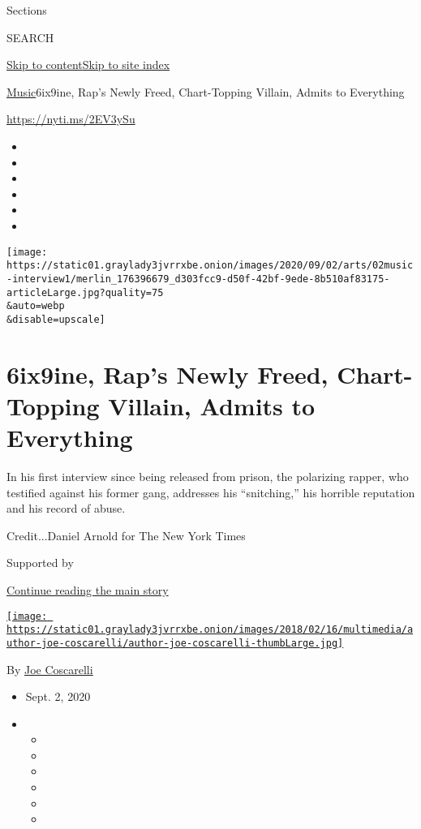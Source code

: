 Sections

SEARCH

\protect\hyperlink{site-content}{Skip to
content}\protect\hyperlink{site-index}{Skip to site index}

\href{/section/arts/music}{Music}\textbar{}6ix9ine, Rap's Newly Freed,
Chart-Topping Villain, Admits to Everything

\url{https://nyti.ms/2EV3ySu}

\begin{itemize}
\item
\item
\item
\item
\item
\item
\end{itemize}

\texttt{[image: https://static01.graylady3jvrrxbe.onion/images/2020/09/02/arts/02music-interview1/merlin\_176396679\_d303fcc9-d50f-42bf-9ede-8b510af83175-articleLarge.jpg?quality=75\\\&auto=webp\\\&disable=upscale]}

\hypertarget{6ix9ine-raps-newly-freed-chart-topping-villain-admits-to-everything}{%
\section{6ix9ine, Rap's Newly Freed, Chart-Topping Villain, Admits to
Everything}\label{6ix9ine-raps-newly-freed-chart-topping-villain-admits-to-everything}}

In his first interview since being released from prison, the polarizing
rapper, who testified against his former gang, addresses his
``snitching,'' his horrible reputation and his record of abuse.

Credit...Daniel Arnold for The New York Times

Supported by

\protect\hyperlink{after-sponsor}{Continue reading the main story}

\href{https://www.nytimes3xbfgragh.onion/by/joe-coscarelli}{\texttt{[image: https://static01.graylady3jvrrxbe.onion/images/2018/02/16/multimedia/author-joe-coscarelli/author-joe-coscarelli-thumbLarge.jpg]}}

By \href{https://www.nytimes3xbfgragh.onion/by/joe-coscarelli}{Joe
Coscarelli}

\begin{itemize}
\item
  Sept. 2, 2020
\item
  \begin{itemize}
  \item
  \item
  \item
  \item
  \item
  \item
  \end{itemize}
\end{itemize}

